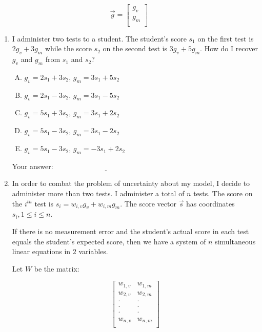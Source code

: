 \documentclass[10pt]{amsart}
\begin{document}
$$\vec{g} = \left[ \begin{matrix} g_v \\ g_m \\\end{matrix}\right]$$
\begin{enumerate}
\item I administer two tests to a student. The student's score $s_1$
  on the first test is $2g_v + 3g_m$ while the score $s_2$ on the
  second test is $3g_v + 5g_m$. How do I recover $g_v$ and $g_m$ from
  $s_1$ and $s_2$?

  \begin{enumerate}[(A)]
  \item $g_v = 2s_1 + 3s_2$, $g_m = 3s_1 + 5s_2$
  \item $g_v = 2s_1 - 3s_2$, $g_m = 3s_1 - 5s_2$
  \item $g_v = 5s_1 + 3s_2$, $g_m  = 3s_1 + 2s_2$
  \item $g_v = 5s_1 - 3s_2$, $g_m = 3s_1 - 2s_2$
  \item $g_v = 5s_1 - 3s_2$, $g_m = -3s_1 + 2s_2$
  \end{enumerate}

  \vspace{0.1in}
  Your answer: $\underline{\qquad\qquad\qquad\qquad\qquad\qquad\qquad}$
  \vspace{0.1in}

\item In order to combat the problem of uncertainty about my model, I
  decide to administer more than two tests. I administer a total of
  $n$ tests. The score on the $i^{th}$ test is $s_i = w_{i,v}g_v
  + w_{i,m}g_m$. The score vector $\vec{s}$ has coordinates $s_i,
  1 \le i \le n$.

  If there is no measurement error and the student's actual score in
  each test equals the student's expected score, then we have a system
  of $n$ simultaneous linear equations in $2$ variables.

  Let $W$ be the matrix:

  $$\left[\begin{matrix} w_{1,v} & w_{1,m} \\ w_{2,v} & w_{2,m} \\ \cdot & \cdot \\ \cdot & \cdot \\ \cdot & \cdot \\ w_{n,v} & w_{n,m} \\\end{matrix}\right]$$


\end{enumerate}
\end{document}

